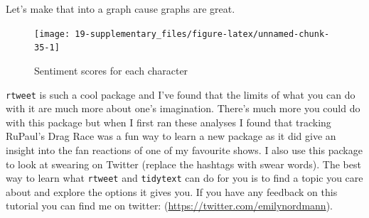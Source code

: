 \documentclass[]{book}
\newenvironment{Shaded}{\begin{snugshade}}{\end{snugshade}}
\newcommand{\DataTypeTok}[1]{\textcolor[rgb]{0.13,0.29,0.53}{#1}}
\newcommand{\DecValTok}[1]{\textcolor[rgb]{0.00,0.00,0.81}{#1}}
\newcommand{\KeywordTok}[1]{\textcolor[rgb]{0.13,0.29,0.53}{\textbf{#1}}}
\newcommand{\NormalTok}[1]{#1}
\newcommand{\OperatorTok}[1]{\textcolor[rgb]{0.81,0.36,0.00}{\textbf{#1}}}
\newcommand{\OtherTok}[1]{\textcolor[rgb]{0.56,0.35,0.01}{#1}}
\newcommand{\StringTok}[1]{\textcolor[rgb]{0.31,0.60,0.02}{#1}}
\begin{document}
Let's make that into a graph cause graphs are great.

\begin{Shaded}
\end{Shaded}

\begin{figure}

{\centering \texttt{[image: 19-supplementary\_files/figure-latex/unnamed-chunk-35-1]} 

}

\caption{Sentiment scores for each character}\label{fig:unnamed-chunk-35}
\end{figure}

\texttt{rtweet} is such a cool package and I've found that the limits of what you can do with it are much more about one's imagination. There's much more you could do with this package but when I first ran these analyses I found that tracking RuPaul's Drag Race was a fun way to learn a new package as it did give an insight into the fan reactions of one of my favourite shows. I also use this package to look at swearing on Twitter (replace the hashtags with swear words). The best way to learn what \texttt{rtweet} and \texttt{tidytext} can do for you is to find a topic you care about and explore the options it gives you. If you have any feedback on this tutorial you can find me on twitter: \citep{emilynordmann}(\url{https://twitter.com/emilynordmann}).
\end{document}
